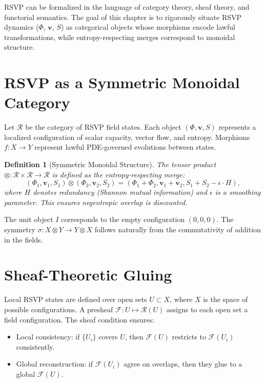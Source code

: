 \documentclass[a4paper,11pt,openany]{book}
\newtheorem{definition}[theorem]{Definition}
\begin{document}
RSVP can be formalized in the language of category theory, sheaf theory, and functorial 
semantics. The goal of this chapter is to rigorously situate RSVP dynamics 
($\Phi$, $\mathbf{v}$, $S$) as categorical objects whose morphisms encode lawful 
transformations, while entropy-respecting merges correspond to monoidal structure.

\section{RSVP as a Symmetric Monoidal Category}

Let $\mathcal{R}$ be the category of RSVP field states. Each object 
$(\Phi, \mathbf{v}, S)$ represents a localized configuration of scalar capacity, 
vector flow, and entropy. Morphisms $f: X \to Y$ represent lawful PDE-governed 
evolutions between states.

\begin{definition}[Symmetric Monoidal Structure]
The tensor product $\otimes: \mathcal{R} \times \mathcal{R} \to \mathcal{R}$ 
is defined as the entropy-respecting merge:
\[
(\Phi_1, \mathbf{v}_1, S_1) \otimes (\Phi_2, \mathbf{v}_2, S_2) 
= (\Phi_1 + \Phi_2, \mathbf{v}_1 + \mathbf{v}_2, S_1 + S_2 - \epsilon \cdot H),
\]
where $H$ denotes redundancy (Shannon mutual information) and $\epsilon$ 
is a smoothing parameter. This ensures negentropic overlap is discounted.
\end{definition}

The unit object $I$ corresponds to the empty configuration $(0,0,0)$. 
The symmetry $\sigma: X\otimes Y \to Y \otimes X$ follows naturally 
from the commutativity of addition in the fields.

\section{Sheaf-Theoretic Gluing}

Local RSVP states are defined over open sets $U \subset X$, where $X$ is the 
space of possible configurations. A presheaf $\mathcal{F}: U \mapsto \mathcal{R}(U)$ 
assigns to each open set a field configuration. The sheaf condition ensures:

\begin{itemize}
  \item Local consistency: if $\{U_i\}$ covers $U$, then $\mathcal{F}(U)$ restricts 
        to $\mathcal{F}(U_i)$ consistently.
  \item Global reconstruction: if $\mathcal{F}(U_i)$ agree on overlaps, then they glue 
        to a global $\mathcal{F}(U)$.
\end{itemize}
\end{document}

